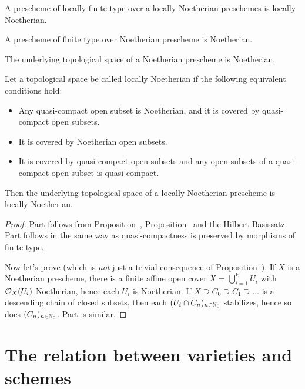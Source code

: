 \documentclass[a4paper,parskip=half,numbers=enddot, DIV=12]{scrreprt}
\begin{document}
\begin{fact}
    \begin{alphanumerate}
    \item 
        A prescheme of locally finite type over a locally Noetherian preschemes is locally Noetherian.
    \item   
        A prescheme of finite type over Noetherian prescheme is Noetherian.
    \item 
        The underlying topological space of a Noetherian prescheme is Noetherian.
    \item 
        Let a topological space be called locally Noetherian if the following equivalent conditions hold:
        \begin{itemize}
        \item[\itememph{\alpha}]
            Any quasi-compact open subset is Noetherian, and it is covered by quasi-compact open subsets.
        \item[\itememph{\beta}]
            It is covered by Noetherian open subsets.
        \item[\itememph{\gamma}] 
            It is covered by quasi-compact open subsets and any open subsets of a quasi-compact open subset is quasi-compact.
        \end{itemize}
        Then the underlying topological space of a locally Noetherian prescheme is locally Noetherian.
    \end{alphanumerate}
\end{fact}
\begin{proof}
	Part  follows from Proposition~, Proposition~ and the Hilbert Basissatz. Part  follows in the same way as quasi-compactness is preserved by morphisms of finite type.
	
	Now let's prove  (which is \emph{not} just a trivial consequence of Proposition~). If $X$ is a Noetherian prescheme, there is a finite affine open cover $X=\bigcup_{i=1}^kU_i$ with $\mathcal{O}_X(U_i)$ Noetherian, hence each $U_i$ is Noetherian. If $X\supseteq C_0\supseteq C_1\supseteq \ldots$ is a descending chain of closed subsets, then each $(U_i\cap C_n)_{n\in\mathbb{N}_0}$ stabilizes, hence so does $(C_n)_{n\in\mathbb{N}_0}$. Part  is similar.
\end{proof}

\section{The relation between varieties and schemes}
\end{document}
